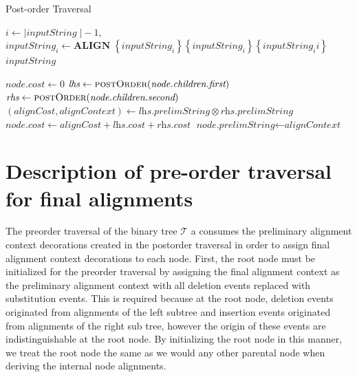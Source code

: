\documentclass[11pt]{article}
\begin{document}
\begin{algorithm}
  \caption{Post-order Traversal}\label{postOrder}
  \begin{algorithmic}[1]
      \State $i \gets \vert\textit{inputString} \;\vert - 1,$
        \State $\textit{inputString}_i \gets \textbf{ALIGN} \; \left\{ \textit{inputString}_i\right\} \left\{ \textit{inputString}_i \right\} \left\{ \textit{inputString}_ii \right\}$
      \EndWhile 
      \Return $\textit{inputString}$
    \EndFunction 
        
        \State $\textit{node.cost} \gets 0$
      \Else
        \State $\textit{lhs}  \gets \Call{postOrder}{\textit{node.children.first}}$
        \State $\textit{rhs}  \gets \Call{postOrder}{\textit{node.children.second}}$
        \State $\left(\textit{alignCost}, \textit{alignContext}\right) \gets \textit{lhs.prelimString} \otimes \textit{rhs.prelimString}$
        \State $\textit{node.cost} \gets \textit{alignCost} + \textit{lhs.cost} + \textit{rhs.cost}$
        \State $\textit{node.prelimString} \gets \textit{alignContext}$
      \EndIf
    \EndFunction
  \end{algorithmic}
\end{algorithm}


\section{Description of pre-order traversal for final alignments}
The preorder traversal of the binary tree $\mathcal{T}$ a consumes the preliminary alignment context decorations created in the postorder traversal in order to assign final alignment context decorations to each node.
First, the root node must be initialized for the preorder traversal by assigning the final alignment context as the preliminary alignment context with all deletion events replaced with substitution events.
This is required because at the root node, deletion events originated from  alignments of the left subtree and insertion events originated from alignments of the right sub tree, however the origin of these events are indistinguishable at the root node.
By initializing the root node in this manner, we treat the root node the same as we would any other parental node when deriving the internal node alignments.
\end{document}
